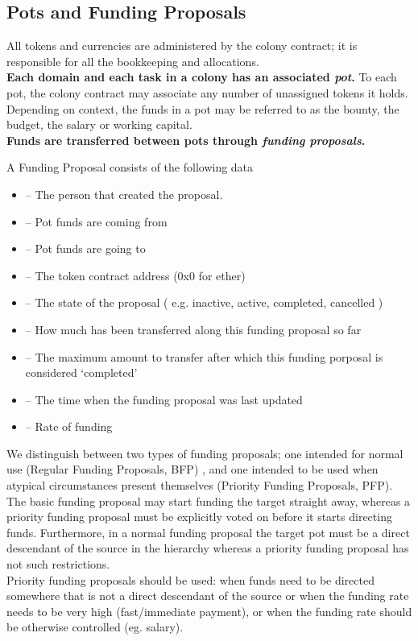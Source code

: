 \subsection{Pots and Funding Proposals}\label{sec:pots-and-fp}
All tokens and currencies are administered by the colony contract; it is responsible for all the bookkeeping and allocations.\\
\textbf{Each domain and each task in a colony has an associated \emph{pot}.} To each pot, the colony contract may associate any number of unassigned tokens it holds. Depending on context, the funds in a pot may be referred to as the bounty, the budget, the salary or working capital.\\
\textbf{Funds are transferred between pots through \emph{funding proposals}.}
\begin{description}
 \item A Funding Proposal consists of the following data
 \begin{itemize}
  \item {}	--	The person that created the proposal.
  \item {}	--	Pot funds are coming from
  \item {}	--	Pot funds are going to
  \item {}	--	The token contract address (0x0 for ether)
  \item {}	--	The state of the proposal ( e.g. inactive, active, completed, cancelled )
  \item {}	--	How much has been transferred along this funding proposal so far
  \item {}	--	The maximum amount to transfer after which this funding porposal is considered `completed'
  \item {}	--	The time when the funding proposal was last updated
  \item {}	--	Rate of funding
 \end{itemize}

\end{description}
We distinguish between two types of funding proposals; one intended for normal use (Regular Funding Proposals, BFP) , and one intended to be used when atypical circumstances present themselves (Priority Funding Proposals, PFP). The basic funding proposal may start funding the target straight away, whereas a priority funding proposal must be explicitly voted on before it starts directing funds. Furthermore, in a normal funding proposal the target pot must be a direct descendant of the source in the hierarchy whereas a priority funding proposal has not such restrictions.\\
Priority funding proposals should be used: when funds need to be directed somewhere that is not a direct descendant of the source or when the funding rate needs to be very high (fast/immediate payment), or when the funding rate should be otherwise controlled (eg. salary).\\

